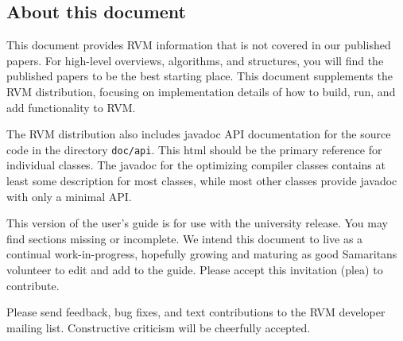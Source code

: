\subsection {About this document}

This document provides RVM information that is not covered in
our published papers.  For high-level overviews, algorithms, and
structures, you will find the published papers to be the best starting
place. This document supplements
the RVM distribution, focusing on implementation
details of how to build, run, and add functionality to RVM.

The RVM distribution also includes javadoc API documentation for the 
source code in the directory {\tt doc/api}.  This html should be the
primary reference for individual classes.  The javadoc for the optimizing
compiler classes contains at least some description for most classes,
while most other classes provide javadoc with only a minimal API.

This version of the user's guide is for use with the university
release.  You may find sections missing or incomplete. We intend this
document to live as a continual work-in-progress, hopefully growing
and maturing as good Samaritans volunteer to edit and add to the
guide.  Please accept this invitation (plea) to contribute.

Please send feedback, bug fixes, and text contributions to the RVM
developer mailing list.  Constructive criticism will be cheerfully 
accepted. 
